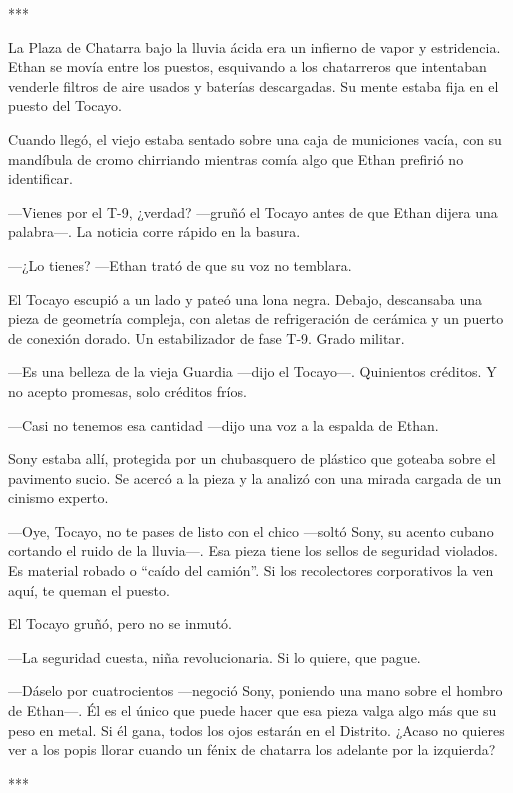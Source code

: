 \documentclass[11pt,twoside]{book}
\begin{document}
\bigskip
\begin{center}***\end{center}
\bigskip

La Plaza de Chatarra bajo la lluvia ácida era un infierno de vapor y estridencia. Ethan se movía entre los puestos, esquivando a los chatarreros que intentaban venderle filtros de aire usados y baterías descargadas. Su mente estaba fija en el puesto del Tocayo.

Cuando llegó, el viejo estaba sentado sobre una caja de municiones vacía, con su mandíbula de cromo chirriando mientras comía algo que Ethan prefirió no identificar.

---Vienes por el T-9, ¿verdad? ---gruñó el Tocayo antes de que Ethan dijera una palabra---. La noticia corre rápido en la basura.

---¿Lo tienes? ---Ethan trató de que su voz no temblara.

El Tocayo escupió a un lado y pateó una lona negra. Debajo, descansaba una pieza de geometría compleja, con aletas de refrigeración de cerámica y un puerto de conexión dorado. Un estabilizador de fase T-9. Grado militar.

---Es una belleza de la vieja Guardia ---dijo el Tocayo---. Quinientos créditos. Y no acepto promesas, solo créditos fríos.

---Casi no tenemos esa cantidad ---dijo una voz a la espalda de Ethan.

Sony estaba allí, protegida por un chubasquero de plástico que goteaba sobre el pavimento sucio. Se acercó a la pieza y la analizó con una mirada cargada de un cinismo experto.

---Oye, Tocayo, no te pases de listo con el chico ---soltó Sony, su acento cubano cortando el ruido de la lluvia---. Esa pieza tiene los sellos de seguridad violados. Es material robado o ``caído del camión''. Si los recolectores corporativos la ven aquí, te queman el puesto.

El Tocayo gruñó, pero no se inmutó.

---La seguridad cuesta, niña revolucionaria. Si lo quiere, que pague.

---Dáselo por cuatrocientos ---negoció Sony, poniendo una mano sobre el hombro de Ethan---. Él es el único que puede hacer que esa pieza valga algo más que su peso en metal. Si él gana, todos los ojos estarán en el Distrito. ¿Acaso no quieres ver a los popis llorar cuando un fénix de chatarra los adelante por la izquierda?

\bigskip
\begin{center}***\end{center}
\bigskip
\end{document}
